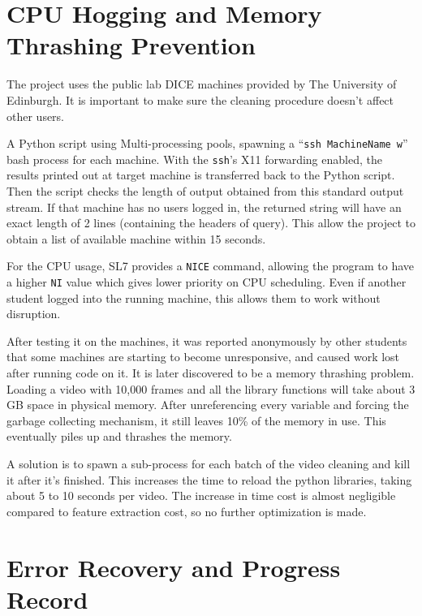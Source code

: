 \documentclass[bsc,logo,twoside,fullspacing,parskip]{infthesis}
\begin{document}
\section{CPU Hogging and Memory Thrashing Prevention}

The project uses the public lab DICE machines provided by The University of Edinburgh. 
It is important to make sure the cleaning procedure doesn't affect other users.

A Python script using Multi-processing pools, spawning a ``{\tt ssh MachineName w}'' bash process for each machine.
With the {\tt ssh}'s X11 forwarding enabled, the results printed out at target machine is transferred back to the Python script. 
Then the script checks the length of output obtained from this standard output stream. 
If that machine has no users logged in, the returned string will have an exact length of 2 lines (containing the headers of query). 
This allow the project to obtain a list of available machine within 15 seconds.

For the CPU usage, SL7 provides a {\tt NICE} command, allowing the program to have a higher {\tt NI} value which gives lower priority on CPU scheduling. Even if another student logged into the running machine, this allows them to work without disruption.

After testing it on the machines, it was reported anonymously by other students that some machines are starting to become unresponsive, and caused work lost after running code on it. It is later discovered to be a memory thrashing problem.
Loading a video with 10,000 frames and all the library functions will take about 3 GB space in physical memory. 
After unreferencing every variable and forcing the garbage collecting mechanism, it still leaves 10\% of the memory in use. This eventually piles up and thrashes the memory. 

A solution is to spawn a sub-process for each batch of the video cleaning and kill it after it's finished. 
This increases the time to reload the python libraries, taking about 5 to 10 seconds per video. 
The increase in time cost is almost negligible compared to feature extraction cost, so no further optimization is made. 


\section{Error Recovery and Progress Record}
\end{document}
